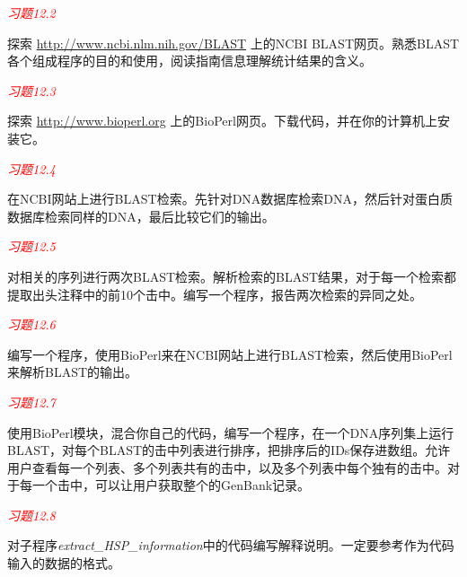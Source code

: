 \textcolor{red}{\textit{习题12.2}}
\begin{adjustwidth}{4em}{}
探索 \href{http://www.ncbi.nlm.nih.gov/BLAST}{http://www.ncbi.nlm.nih.gov/BLAST} 上的NCBI BLAST网页。熟悉BLAST各个组成程序的目的和使用，阅读指南信息理解统计结果的含义。
\end{adjustwidth}

\textcolor{red}{\textit{习题12.3}}
\begin{adjustwidth}{4em}{}
探索 \href{http://www.bioperl.org}{http://www.bioperl.org} 上的BioPerl网页。下载代码，并在你的计算机上安装它。
\end{adjustwidth}

\textcolor{red}{\textit{习题12.4}}
\begin{adjustwidth}{4em}{}
在NCBI网站上进行BLAST检索。先针对DNA数据库检索DNA，然后针对蛋白质数据库检索同样的DNA，最后比较它们的输出。
\end{adjustwidth}

\textcolor{red}{\textit{习题12.5}}
\begin{adjustwidth}{4em}{}
对相关的序列进行两次BLAST检索。解析检索的BLAST结果，对于每一个检索都提取出头注释中的前10个击中。编写一个程序，报告两次检索的异同之处。
\end{adjustwidth}

\textcolor{red}{\textit{习题12.6}}
\begin{adjustwidth}{4em}{}
编写一个程序，使用BioPerl来在NCBI网站上进行BLAST检索，然后使用BioPerl来解析BLAST的输出。
\end{adjustwidth}

\textcolor{red}{\textit{习题12.7}}
\begin{adjustwidth}{4em}{}
使用BioPerl模块，混合你自己的代码，编写一个程序，在一个DNA序列集上运行BLAST，对每个BLAST的击中列表进行排序，把排序后的IDs保存进数组。允许用户查看每一个列表、多个列表共有的击中，以及多个列表中每个独有的击中。对于每一个击中，可以让用户获取整个的GenBank记录。
\end{adjustwidth}

\textcolor{red}{\textit{习题12.8}}
\begin{adjustwidth}{4em}{}
对子程序\textit{extract\_HSP\_information}中的代码编写解释说明。一定要参考作为代码输入的数据的格式。
\end{adjustwidth}


